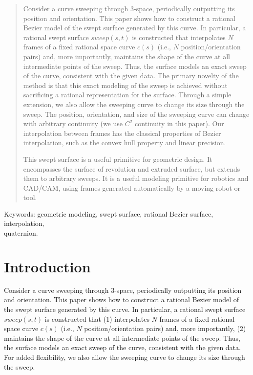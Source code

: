 \maketitle
\begin{abstract}
Consider a curve sweeping through 3-space,
periodically outputting its position and orientation.
This paper shows how to construct a rational Bezier model of the swept
surface generated by this curve.
In particular, a rational swept surface $sweep(s,t)$ is constructed that interpolates
$N$ frames of a fixed rational space curve $c(s)$ (i.e., $N$ position/orientation pairs) 
and, more importantly, maintains the shape of the curve at all intermediate points 
of the sweep.
Thus, the surface models
an exact sweep of the curve, consistent with the given data.
The primary novelty of the method is that 
this exact modeling of the sweep is achieved
without sacrificing a rational representation for the surface.
Through a simple extension, we also allow the sweeping curve to change
its size through the sweep.
The position, orientation, and size of the sweeping curve can change with
arbitrary continuity (we use $C^2$ continuity in this paper).
Our interpolation between frames has the classical properties
of Bezier interpolation, such as the convex hull property and linear precision.

This swept surface is a useful primitive for geometric design.
It encompasses the surface of revolution and extruded surface, but extends
them to arbitrary sweeps.
It is a useful modeling primitive for robotics and CAD/CAM, using frames generated
automatically by a moving robot or tool.
\end{abstract}

Keywords: geometric modeling, swept surface, rational Bezier surface,
	interpolation,\\ quaternion.

\section{Introduction}

Consider a curve sweeping through 3-space,
periodically outputting its position and orientation.
This paper shows how to construct a rational Bezier model of the swept
surface generated by this curve.
In particular, a rational swept surface $sweep(s,t)$ is constructed that 
(1) interpolates
$N$ frames of a fixed rational space curve $c(s)$ (i.e., $N$ position/orientation pairs) 
and, more importantly, (2) maintains the shape of the curve at all intermediate points 
of the sweep.
Thus, the surface models 
an exact sweep of the curve, consistent with the given data.
For added flexibility, we also allow the sweeping curve to change its
size through the sweep.

